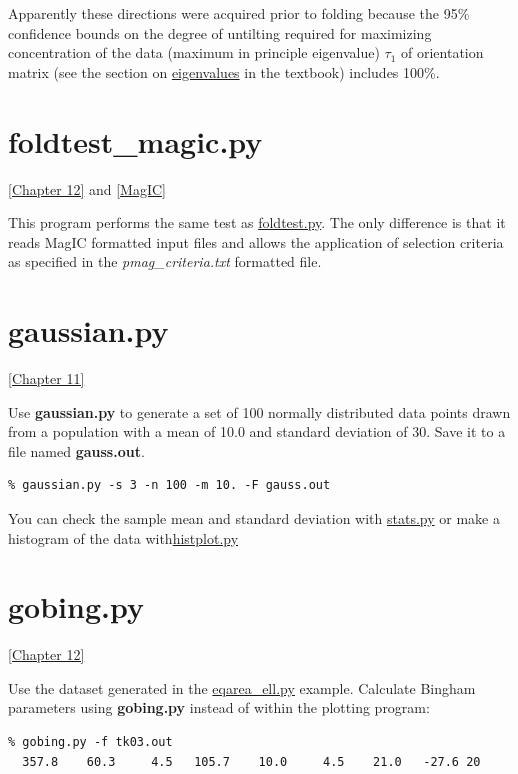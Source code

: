 \documentclass[11pt]{book}
\begin{document}
{{{ Apparently these directions were acquired prior to folding because the 95\% confidence bounds on the degree of untilting required for maximizing concentration of the data (maximum in principle eigenvalue) $\tau_1$ of orientation matrix (see the section on  \href{Webbook2.html#orientation_tensor}{eigenvalues} in the textbook) includes 100\%.  
% 
% 
\section{foldtest\_magic.py} \href{http://Webbook2.html#Beyond_Fisher_statistics}{[Chapter 12]} and \href{#MagIC}{[MagIC]}

This program performs the same test as \href{#foldtest.py}{foldtest.py}.  The only difference is that it reads MagIC formatted input files and allows the application of selection criteria as specified in the {\it pmag\_criteria.txt} formatted file.   
% 
% 
\section{gaussian.py} 
 \href{http://Webbook2.html#Fisher_statistics}{[Chapter 11]}

Use {\bf gaussian.py} to generate a set of 100 normally distributed data points drawn from a population with a mean of 10.0  and   standard deviation of 30.  Save it to a file named {\bf gauss.out}.  

\begin{verbatim}
% gaussian.py -s 3 -n 100 -m 10. -F gauss.out
\end{verbatim}

You can check the sample mean and standard deviation with \href{#stats.py}{stats.py} or make a histogram of the data with\href{#hisplot.py}{histplot.py}




\section {\bf gobing.py}
 \href{http://Webbook2.html#Beyond_Fisher_statistics}{[Chapter 12]}

Use the dataset generated in the \href{#eqarea_ell.py}{eqarea\_ell.py} example.   Calculate Bingham parameters using {\bf gobing.py}  instead of within the plotting program:

\begin{verbatim}
% gobing.py -f tk03.out 
  357.8    60.3     4.5   105.7    10.0     4.5    21.0   -27.6 20
\end{verbatim}

}}}
\end{document}
